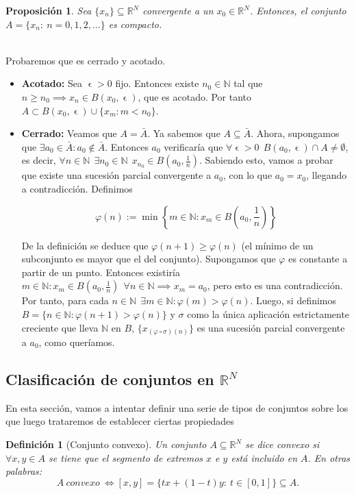 \documentclass[11pt, a4paper, titlepage]{article}
\makeatletter
\let\epsilon\upvarepsilon
\renewenvironment{proof}[1][\proofname] {\vspace{-15pt}\par\pushQED{\qed}\normalfont\topsep6\p@\@plus6\p@\relax\trivlist\item[\hskip\labelsep\it#1\@addpunct{.}]\ignorespaces}{\popQED\endtrivlist\@endpefalse}
\theoremstyle{theorem-style}
\newtheorem*{nprop}{Proposición}
\theoremstyle{definition-style}
\newtheorem*{ndef}{Definición}
\theoremstyle{remark-style}
\theoremstyle{example-style}
\makeatother
\begin{document}
\begin{nprop}
Sea $\{x_n\} \subseteq \mathbb{R}^N$ convergente a un $x_0 \in \mathbb{R}^N$. Entonces, el conjunto \hfill \\$A = \{x_n:\ n=0,1,2,\dots \}$ es compacto.
\end{nprop}

\begin{proof}\hfill\\
  Probaremos que es cerrado y acotado.

  \begin{itemize}
  \item \textbf{Acotado:} Sea $\epsilon>0$ fijo. Entonces existe $n_0 \in \mathbb{N}$ tal que $n \ge n_0 \implies x_n \in B(x_0, \epsilon)$, que es acotado.
    Por tanto $A \subset B(x_0, \epsilon) \cup \{ x_m : m < n_0 \}$.
    
  \item \textbf{Cerrado:} Veamos que $A = \bar{A}$. Ya sabemos que $A \subseteq \bar{A}$. Ahora, supongamos que $\exists a_0 \in \bar{A} : a_0 \notin \bar{A}$.
    Entonces $a_0$ verificaría que $\forall \epsilon > 0 \ \ B(a_0, \epsilon) \cap A \ne \emptyset$, es decir, $\forall n \in \mathbb{N} \ \ \exists n_0\in \mathbb{N} \ \ x_{n_0} \in B\left(a_0, \frac{1}{n}\right)$.
    Sabiendo esto, vamos a probar que existe una sucesión parcial convergente a $a_0$, con lo que $a_0 = x_0$, llegando a contradicción. Definimos

    \[
       \varphi(n) := \min \left\{ m\in \mathbb{N} : x_m \in B\left(a_0, \frac{1}{n}\right) \right\}
       \]

       De la definición se deduce que $\varphi(n+1) \ge \varphi(n)$ (el mínimo de un subconjunto es mayor que el del conjunto). Supongamos que $\varphi$ es constante a partir de un punto.
       Entonces existiría $m \in \mathbb{N} : x_m \in B(a_0, \frac{1}{n}) \ \ \forall n\in \mathbb{N} \implies x_m = a_0$, pero esto es una contradicción. Por tanto, para cada $n \in \mathbb{N} \ \ \exists m \in \mathbb{N} : \varphi(m) > \varphi(n)$. Luego, si definimos $B = \{ n \in \mathbb{N} : \varphi(n+1) > \varphi(n) \}$ y $\sigma$ como la única aplicación estrictamente creciente que lleva $\mathbb{N}$ en $B$, $\{x_{(\varphi \circ \sigma)(n)}\}$ es una sucesión parcial convergente a $a_0$, como queríamos.
  \end{itemize}
\end{proof}



\subsection{Clasificación de conjuntos en $\mathbb{R}^N$}
En esta sección, vamos a intentar definir una serie de tipos de conjuntos sobre los que luego trataremos de establecer ciertas propiedades
\begin{ndef}[Conjunto convexo]
Un conjunto $A\subseteq \mathbb{R}^N$ se dice \textit{convexo} si $\forall x,y \in A$ se tiene que el segmento de extremos $x$ e $y$ está incluido en $A$. En otras palabras: $$A\ convexo\ \iff [x,y] = \{tx + (1-t)y: \ t\in [0,1]\} \subseteq A.$$
\end{ndef}
\end{document}
